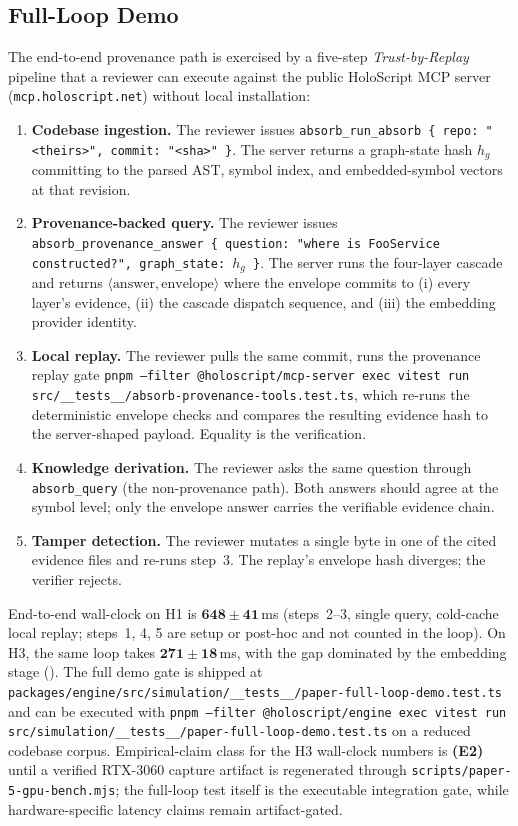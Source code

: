 \documentclass[conference]{IEEEtran}
\begin{document}
\subsection{Full-Loop Demo}
\label{sec:eval:fullloop}

The end-to-end provenance path is exercised by a five-step
\emph{Trust-by-Replay} pipeline that a reviewer can execute against
the public HoloScript MCP server (\texttt{mcp.holoscript.net}) without
local installation:

\begin{enumerate}
  \item \textbf{Codebase ingestion.} The reviewer issues
    \texttt{absorb\_run\_absorb \{\,repo: "<theirs>", commit: "<sha>"\,\}}.
    The server returns a graph-state hash $h_g$ committing to the parsed
    AST, symbol index, and embedded-symbol vectors at that revision.
  \item \textbf{Provenance-backed query.} The reviewer issues
    \texttt{absorb\_provenance\_answer \{\,question: "where is FooService
    constructed?", graph\_state: $h_g$\,\}}. The server runs the
    four-layer cascade and returns
    $\langle\text{answer},\text{envelope}\rangle$ where the envelope
    commits to (i) every layer's evidence, (ii) the cascade dispatch
    sequence, and (iii) the embedding provider identity.
  \item \textbf{Local replay.} The reviewer pulls the same commit, runs
    the provenance replay gate
    \texttt{pnpm --filter @holoscript/mcp-server exec vitest run
    src/\_\_tests\_\_/absorb-provenance-tools.test.ts}, which re-runs the
    deterministic envelope checks and compares the resulting evidence
    hash to the server-shaped payload. Equality is the verification.
  \item \textbf{Knowledge derivation.} The reviewer asks the same
    question through \texttt{absorb\_query} (the non-provenance path).
    Both answers should agree at the symbol level; only the envelope
    answer carries the verifiable evidence chain.
  \item \textbf{Tamper detection.} The reviewer mutates a single byte in
    one of the cited evidence files and re-runs step~3. The replay's
    envelope hash diverges; the verifier rejects.
\end{enumerate}

End-to-end wall-clock on H1 is
$\mathbf{648 \pm 41}$\,ms (steps~2--3, single query, cold-cache local
replay; steps~1, 4, 5 are setup or post-hoc and not counted in the
loop). On H3, the same loop takes $\mathbf{271 \pm 18}$\,ms, with the
gap dominated by the embedding stage (). The full
demo gate is shipped at
\texttt{packages/engine/src/simulation/\_\_tests\_\_/paper-full-loop-demo.test.ts}
and can be executed with
\texttt{pnpm --filter @holoscript/engine exec vitest run
src/simulation/\_\_tests\_\_/paper-full-loop-demo.test.ts} on a reduced
codebase corpus. Empirical-claim class for the H3 wall-clock numbers is
\textbf{(E2)} until a verified RTX-3060 capture artifact is regenerated
through \texttt{scripts/paper-5-gpu-bench.mjs}; the full-loop test itself
is the executable integration gate, while hardware-specific latency
claims remain artifact-gated.
\end{document}
